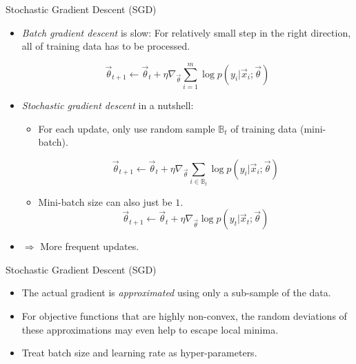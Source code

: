 \begin{vbframe}{Stochastic Gradient Descent (SGD)}

\vfill

\begin{itemize}
\item \emph{Batch gradient descent} is slow: For relatively small step in the right direction, all of training data has to be processed.


$$\vec \theta_{t+1} \leftarrow \vec \theta_t + \eta \nabla_{\vec\theta} \sum_{i=1}^m \log  p(y_i | \vec x_i; \vec \theta)$$


\item \emph{Stochastic gradient descent} in a nutshell:
\begin{itemize}
 \item For each update, only use random sample $\mathbb{B}_t$ of training data (mini-batch).

$$\vec \theta_{t+1} \leftarrow \vec \theta_t + \eta \nabla_{\vec\theta} \sum_{i \in \mathbb{B}_t} \log  p(y_i | \vec x_i; \vec \theta)$$

 
 \item Mini-batch size can also just be $1$.
$$\vec \theta_{t+1} \leftarrow \vec \theta_t + \eta \nabla_{\vec\theta} \log  p(y_t | \vec x_t; \vec \theta)$$ 
\end{itemize}
\item $\Rightarrow$ More frequent updates.
\end{itemize}

\vfill

\end{vbframe}



\begin{vbframe}{Stochastic Gradient Descent (SGD)}

\vfill

\begin{itemize}
\item The actual gradient is \emph{approximated} using only a sub-sample of the data.
\item For objective functions that are highly non-convex, the random deviations of these approximations may even help to escape local minima.
\item Treat batch size and learning rate as hyper-parameters.
\end{itemize}
\begin{center}
\end{center}

\vfill

\end{vbframe}



\endlecture

